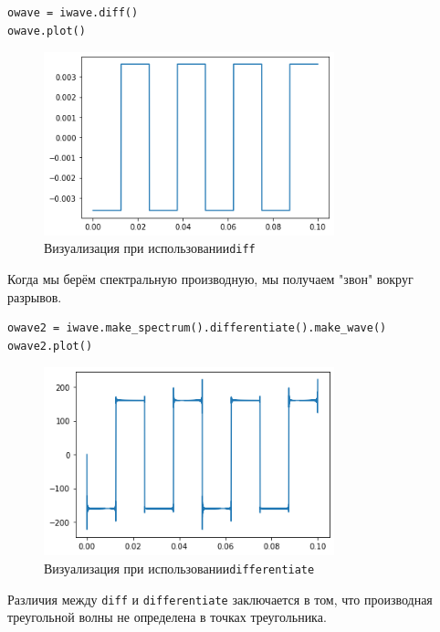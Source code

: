 \documentclass[a4paper,12pt]{report}
\begin{document}
\begin{lstlisting}[caption=Визуализация при \texttt{diff}]
owave = iwave.diff()
owave.plot()
\end{lstlisting}

\begin{figure}[H]
        \centering
        \includegraphics[width=0.75\textwidth]{2.png}
        \caption{Визуализация при использовании\texttt{diff}}
        \label{2}
\end{figure}

Когда мы берём спектральную производную, мы получаем "звон" вокруг разрывов.

\begin{lstlisting}[caption=Визуализация при \texttt{differentiate}]
owave2 = iwave.make_spectrum().differentiate().make_wave()
owave2.plot()
\end{lstlisting}

\begin{figure}[H]
        \centering
        \includegraphics[width=0.75\textwidth]{3.png}
        \caption{Визуализация при использовании\texttt{differentiate}}
        \label{3}
\end{figure}

Различия между \texttt{diff} и \texttt{differentiate} заключается в том, что производная треугольной волны не определена в точках треугольника.
\end{document}
